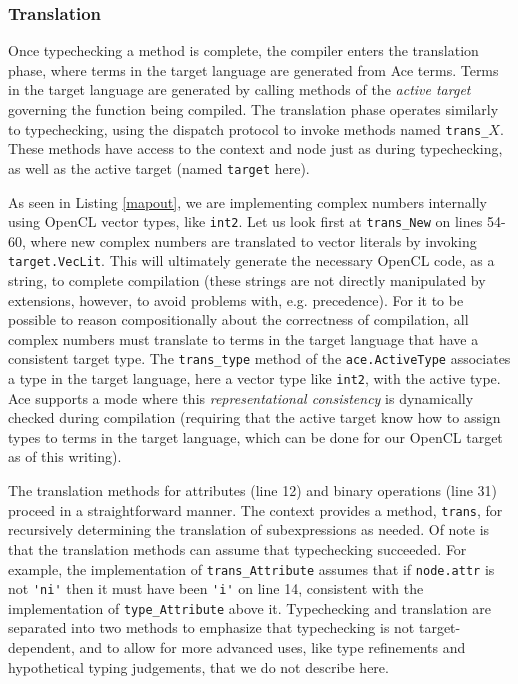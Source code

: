 
\subsubsection{Translation}
Once typechecking a method is complete, the compiler enters the translation phase, where terms in the target language are generated from Ace terms. Terms in the target language are generated by calling methods of the \emph{active target} governing the function being compiled. The translation phase operates similarly to typechecking, using the dispatch protocol to invoke methods named \verb|trans_|$X$. These methods have access to the context and node just as during typechecking, as well as the active target (named \verb|target| here).

As seen in Listing \ref{mapout}, we are implementing complex numbers internally using OpenCL vector types, like \verb|int2|. Let us look first at \verb|trans_New| on lines 54-60, where new complex numbers are translated to vector literals by invoking \verb|target.VecLit|. This will ultimately  generate the necessary OpenCL code, as a string, to complete compilation (these strings are not directly manipulated by extensions, however, to avoid problems with, e.g. precedence). For it to be possible to reason compositionally about the correctness of compilation, all complex numbers must translate to terms in the target language that have a consistent target type. The \verb|trans_type| method of the \verb|ace.ActiveType| associates a type in the target language, here a vector type like \verb|int2|, with the active type. Ace supports a mode where this \emph{representational consistency} is dynamically checked during compilation (requiring that the active target know how to assign types to terms in the target language, which can be done  for our OpenCL target as of this writing).

The translation methods for attributes (line 12) and binary operations  (line 31) proceed in a straightforward manner. The context provides a method, \verb|trans|, for recursively determining the translation of subexpressions as needed. Of note is that the translation methods can assume that typechecking succeeded. For example, the implementation of \verb|trans_Attribute| assumes that if \verb|node.attr| is not \verb|'ni'| then it must have been \verb|'i'| on line 14, consistent with the implementation of \verb|type_Attribute| above it. Typechecking and translation are separated into two methods to emphasize that typechecking is not target-dependent, and to allow for more advanced uses, like type refinements and hypothetical typing judgements, that we do not describe here.

